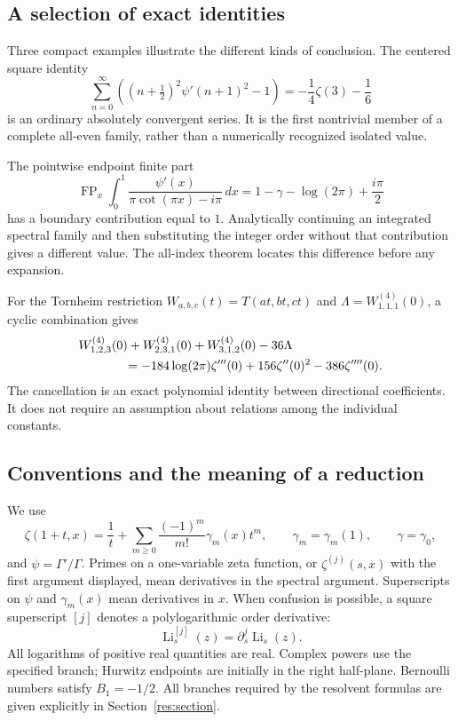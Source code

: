 \documentclass[11pt,a4paper]{article}
\numberwithin{equation}{section}
\theoremstyle{definition}
\theoremstyle{remark}
\DeclareMathOperator{\Li}{Li}
\begin{document}
\subsection{A selection of exact identities}

Three compact examples illustrate the different kinds of conclusion.
The centered square identity
\begin{equation}\label{scope:sample-square}
 \sum_{n=0}^{\infty}
 \left((n+\tfrac12)^2\psi'(n+1)^2-1\right)
       =-\frac14\zeta(3)-\frac16
\end{equation}
is an ordinary absolutely convergent series. It is the first
nontrivial member of a complete all-even family, rather than a
numerically recognized isolated value.

The pointwise endpoint finite part
\begin{equation}\label{scope:sample-resolvent}
 \operatorname{FP}_x\int_0^1
 \frac{\psi'(x)}{\pi\cot(\pi x)-i\pi}\,dx
       =1-\gamma-\log(2\pi)+\frac{i\pi}{2}
\end{equation}
has a boundary contribution equal to $1$. Analytically continuing an
integrated spectral family and then substituting the integer order
without that contribution gives a different value. The all-index
theorem locates this difference before any expansion.

For the Tornheim restriction $W_{a,b,c}(t)=T(at,bt,ct)$ and
$\Lambda=W_{1,1,1}^{(4)}(0)$, a cyclic combination gives
\begin{align}\label{scope:sample-quartic}
 &W_{1,2,3}^{(4)}(0)+W_{2,3,1}^{(4)}(0)
       +W_{3,1,2}^{(4)}(0)-36\Lambda\notag\\
 &\hspace{13mm}=-184\log(2\pi)\zeta'''(0)
                +156\zeta''(0)^2-386\zeta''''(0).
\end{align}
The cancellation is an exact polynomial identity between directional
coefficients. It does not require an assumption about relations among
the individual constants.

\subsection{Conventions and the meaning of a reduction}

We use
\[
 \zeta(1+t,x)=\frac1t+
      \sum_{m\ge0}\frac{(-1)^m}{m!}\gamma_m(x)t^m,\qquad
 \gamma_m=\gamma_m(1),\qquad \gamma=\gamma_0,
\]
and $\psi=\Gamma'/\Gamma$. Primes on a one-variable zeta function, or
$\zeta^{(j)}(s,x)$ with the first argument displayed, mean derivatives
in the spectral argument. Superscripts on $\psi$ and $\gamma_m(x)$
mean derivatives in $x$. When confusion is possible, a square
superscript $[j]$ denotes a polylogarithmic order derivative:
\[
 \Li_s^{[j]}(z)=\partial_s^j\Li_s(z).
\]
All logarithms of positive real quantities are real. Complex powers
use the specified branch; Hurwitz endpoints are initially in the
right half-plane. Bernoulli numbers satisfy $B_1=-1/2$.
All branches required by the resolvent formulas are given explicitly
in Section~\ref{res:section}.
\end{document}
